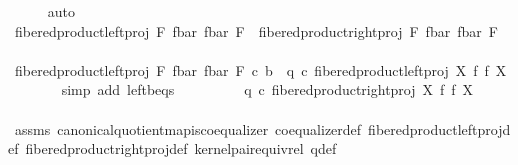 \begin{isabellebody}
\ \ \ \ \isamarkupfalse%
\ auto\isanewline
\isanewline
\ \isanewline
\ \ \isamarkupfalse%
\ {\isachardoublequoteopen}fibered{\isacharunderscore}{\kern0pt}product{\isacharunderscore}{\kern0pt}left{\isacharunderscore}{\kern0pt}proj\ F\ {\isacharparenleft}{\kern0pt}f{\isacharunderscore}{\kern0pt}bar{\isacharparenright}{\kern0pt}\ {\isacharparenleft}{\kern0pt}f{\isacharunderscore}{\kern0pt}bar{\isacharparenright}{\kern0pt}\ F\ {\isacharequal}{\kern0pt}\ fibered{\isacharunderscore}{\kern0pt}product{\isacharunderscore}{\kern0pt}right{\isacharunderscore}{\kern0pt}proj\ F\ {\isacharparenleft}{\kern0pt}f{\isacharunderscore}{\kern0pt}bar{\isacharparenright}{\kern0pt}\ {\isacharparenleft}{\kern0pt}f{\isacharunderscore}{\kern0pt}bar{\isacharparenright}{\kern0pt}\ F{\isachardoublequoteclose}\isanewline
\ \ \isamarkupfalse%
\ {\isacharminus}{\kern0pt}\ \isanewline
\ \ \ \ \isamarkupfalse%
\ {\isachardoublequoteopen}{\isacharparenleft}{\kern0pt}fibered{\isacharunderscore}{\kern0pt}product{\isacharunderscore}{\kern0pt}left{\isacharunderscore}{\kern0pt}proj\ F\ {\isacharparenleft}{\kern0pt}f{\isacharunderscore}{\kern0pt}bar{\isacharparenright}{\kern0pt}\ {\isacharparenleft}{\kern0pt}f{\isacharunderscore}{\kern0pt}bar{\isacharparenright}{\kern0pt}\ F{\isacharparenright}{\kern0pt}\ {\isasymcirc}\isactrlsub c\ b\ {\isacharequal}{\kern0pt}\ q\ {\isasymcirc}\isactrlsub c\ fibered{\isacharunderscore}{\kern0pt}product{\isacharunderscore}{\kern0pt}left{\isacharunderscore}{\kern0pt}proj\ X\ f\ f\ X{\isachardoublequoteclose}\isanewline
\ \ \ \ \ \ \isamarkupfalse%
\ {\isacharparenleft}{\kern0pt}simp\ add{\isacharcolon}{\kern0pt}\ left{\isacharunderscore}{\kern0pt}b{\isacharunderscore}{\kern0pt}eqs{\isacharparenright}{\kern0pt}\isanewline
\ \ \ \ \isamarkupfalse%
\ \isamarkupfalse%
\ {\isachardoublequoteopen}{\isachardot}{\kern0pt}{\isachardot}{\kern0pt}{\isachardot}{\kern0pt}\ {\isacharequal}{\kern0pt}\ q\ {\isasymcirc}\isactrlsub c\ fibered{\isacharunderscore}{\kern0pt}product{\isacharunderscore}{\kern0pt}right{\isacharunderscore}{\kern0pt}proj\ X\ f\ f\ X{\isachardoublequoteclose}\isanewline
\ \ \ \ \ \ \isamarkupfalse%
\ assms{\isacharparenleft}{\kern0pt}{}{\isacharparenright}{\kern0pt}\ canonical{\isacharunderscore}{\kern0pt}quotient{\isacharunderscore}{\kern0pt}map{\isacharunderscore}{\kern0pt}is{\isacharunderscore}{\kern0pt}coequalizer\ coequalizer{\isacharunderscore}{\kern0pt}def\ fibered{\isacharunderscore}{\kern0pt}product{\isacharunderscore}{\kern0pt}left{\isacharunderscore}{\kern0pt}proj{\isacharunderscore}{\kern0pt}def\ fibered{\isacharunderscore}{\kern0pt}product{\isacharunderscore}{\kern0pt}right{\isacharunderscore}{\kern0pt}proj{\isacharunderscore}{\kern0pt}def\ kernel{\isacharunderscore}{\kern0pt}pair{\isacharunderscore}{\kern0pt}equiv{\isacharunderscore}{\kern0pt}rel\ q{\isacharunderscore}{\kern0pt}def\ \isamarkupfalse%

\end{isabellebody}
